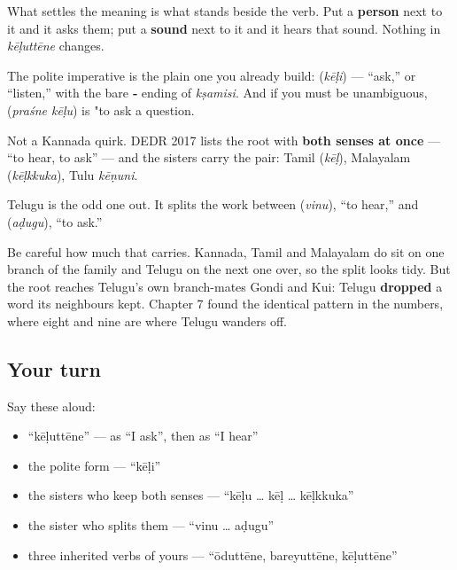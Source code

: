 \begin{grammarlens}[title={Grammar Lens: how you tell which job it is doing}]
What settles the meaning is what stands beside the verb. Put a \textbf{person} next to it and it asks them; put a \textbf{sound} next to it and it hears that sound. Nothing in \emph{kēḷuttēne} changes.

The polite imperative is the plain one you already build: \textbf{} (\emph{kēḷi}) — \textquotedblleft{}ask,\textquotedblright{} or \textquotedblleft{}listen,\textquotedblright{} with the bare \textbf{‑} ending of \emph{kṣamisi}. And if you must be unambiguous, \textbf{ } (\emph{praśne kēḷu}) is "to ask a question.
\end{grammarlens}

\begin{cousinweb}
Not a Kannada quirk. DEDR 2017 lists the root with \textbf{both senses at once} — \textquotedblleft{}to hear, to ask\textquotedblright{} — and the sisters carry the pair: Tamil \textbf{} (\emph{kēḷ}), Malayalam \textbf{} (\emph{kēḷkkuka}), Tulu \emph{kēṇuni}.

Telugu is the odd one out. It splits the work between \textbf{} (\emph{vinu}), \textquotedblleft{}to hear,\textquotedblright{} and \textbf{} (\emph{aḍugu}), \textquotedblleft{}to ask.\textquotedblright{}

Be careful how much that carries. Kannada, Tamil and Malayalam do sit on one branch of the family and Telugu on the next one over, so the split looks tidy. But the root reaches Telugu's own branch-mates Gondi and Kui: Telugu \textbf{dropped} a word its neighbours kept. Chapter 7 found the identical pattern in the numbers, where eight and nine are where Telugu wanders off.
\end{cousinweb}

\subsection*{Your turn}
Say these aloud:

\begin{itemize}
\raggedright
  \item \textquotedblleft{}kēḷuttēne\textquotedblright{} — as \textquotedblleft{}I ask\textquotedblright{}, then as \textquotedblleft{}I hear\textquotedblright{}
  \item the polite form — \textquotedblleft{}kēḷi\textquotedblright{}
  \item the sisters who keep both senses — \textquotedblleft{}kēḷu … kēḷ … kēḷkkuka\textquotedblright{}
  \item the sister who splits them — \textquotedblleft{}vinu … aḍugu\textquotedblright{}
  \item three inherited verbs of yours — \textquotedblleft{}ōduttēne, bareyuttēne, kēḷuttēne\textquotedblright{}
\end{itemize}

